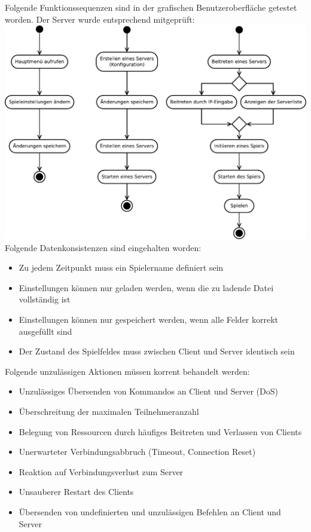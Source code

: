 \documentclass[a4paper,10pt]{article}
\begin{document}
Folgende Funktionssequenzen sind in der grafischen Benutzeroberfläche getestet worden. Der Server wurde entsprechend mitgeprüft: \\
\includegraphics[width=17cm]{Diagram1} \\
Folgende Datenkonsistenzen sind eingehalten worden:
\begin{itemize}
\item Zu jedem Zeitpunkt muss ein Spielername definiert sein
\item Einstellungen können nur geladen werden, wenn die zu ladende Datei vollständig ist
\item Einstellungen können nur gespeichert werden, wenn alle Felder korrekt ausgefüllt sind
\item Der Zustand des Spielfeldes muss zwischen Client und Server identisch sein
\end{itemize}
Folgende unzulässigen Aktionen müssen korrent behandelt werden:
\begin{itemize}
\item Unzulässiges Übersenden von Kommandos an Client und Server (DoS)
\item Überschreitung der maximalen Teilnehmeranzahl
\item Belegung von Ressourcen durch häufiges Beitreten und Verlassen von Clients
\item Unerwarteter Verbindungsabbruch (Timeout, Connection Reset)
\item Reaktion auf Verbindungsverlust zum Server
\item Unsauberer Restart des Clients
\item Übersenden von undefinierten und unzulässigen Befehlen an Client und Server
\end{itemize}
\end{document}
